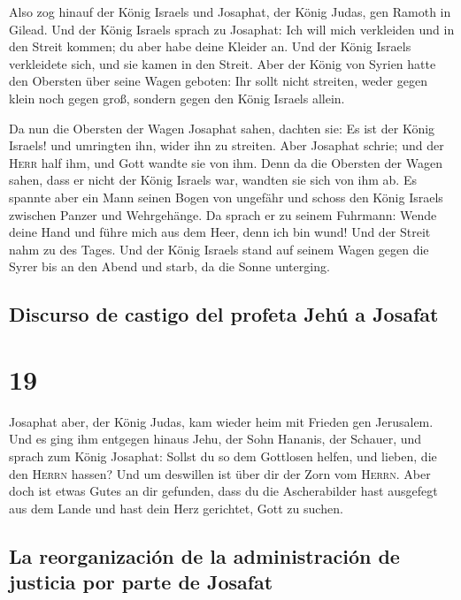  Also zog hinauf der König Israels und Josaphat, der
König Judas, gen Ramoth in Gilead.  Und der König Israels
sprach zu Josaphat: Ich will mich verkleiden und in den Streit kommen;
du aber habe deine Kleider an. Und der König Israels verkleidete sich,
und sie kamen in den Streit.  Aber der König von Syrien
hatte den Obersten über seine Wagen geboten: Ihr sollt nicht streiten,
weder gegen klein noch gegen groß, sondern gegen den König Israels
allein.

 Da nun die Obersten der Wagen Josaphat sahen, dachten
sie: Es ist der König Israels! und umringten ihn, wider ihn zu streiten.
Aber Josaphat schrie; und der \textsc{Herr} half ihm, und Gott wandte
sie von ihm.  Denn da die Obersten der Wagen sahen, dass
er nicht der König Israels war, wandten sie sich von ihm ab.
 Es spannte aber ein Mann seinen Bogen von ungefähr und
schoss den König Israels zwischen Panzer und Wehrgehänge. Da sprach er
zu seinem Fuhrmann: Wende deine Hand und führe mich aus dem Heer, denn
ich bin wund!  Und der Streit nahm zu des Tages. Und der
König Israels stand auf seinem Wagen gegen die Syrer bis an den Abend
und starb, da die Sonne unterging.

\hypertarget{discurso-de-castigo-del-profeta-jehuxfa-a-josafat}{%
\subsection{Discurso de castigo del profeta Jehú a
Josafat}\label{discurso-de-castigo-del-profeta-jehuxfa-a-josafat}}

\hypertarget{section-18}{%
\section{19}\label{section-18}}

 Josaphat aber, der König Judas, kam wieder heim mit
Frieden gen Jerusalem.  Und es ging ihm entgegen hinaus
Jehu, der Sohn Hananis, der Schauer, und sprach zum König Josaphat:
Sollst du so dem Gottlosen helfen, und lieben, die den \textsc{Herrn}
hassen? Und um deswillen ist über dir der Zorn vom \textsc{Herrn}.
 Aber doch ist etwas Gutes an dir gefunden, dass du die
Ascherabilder hast ausgefegt aus dem Lande und hast dein Herz gerichtet,
Gott zu suchen.

\hypertarget{la-reorganizaciuxf3n-de-la-administraciuxf3n-de-justicia-por-parte-de-josafat}{%
\subsection{La reorganización de la administración de justicia por parte
de
Josafat}\label{la-reorganizaciuxf3n-de-la-administraciuxf3n-de-justicia-por-parte-de-josafat}}

